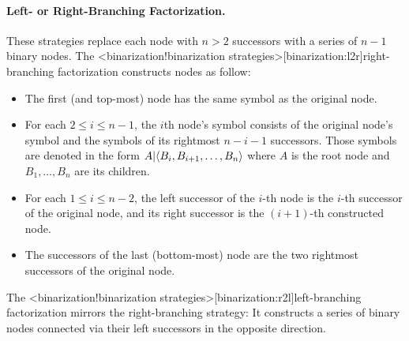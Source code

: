 \documentclass[../../document.tex]{subfiles}
\begin{document}
    \paragraph{Left- or Right-Branching Factorization.}
    These strategies replace each node with \( n>2 \) successors with a series of \( n-1 \) binary nodes.
    The <binarization!binarization strategies>[binarization:l2r]{right-branching factorization} constructs nodes as follow:
    \begin{itemize}
        \item The first (and top-most) node has the same symbol as the original node.
        \item For each \(2 \leq i \leq n-1\), the \(i\)th node's symbol consists of the original node's symbol and the symbols of its rightmost \(n-i-1\) successors. Those symbols are denoted in the form \({A}|\!\left<{B_i,B_{i+1},\ldots,B_n}\right>\) where \(A\) is the root node and \(B_1, \ldots, B_n\) are its children.
        \item For each \(1 \leq i \leq n-2\), the left successor of the \(i\)-th node is the \(i\)-th successor of the original node, and its right successor is the \((i+1)\)-th constructed node.
        \item The successors of the last (bottom-most) node are the two rightmost successors of the original node.
    \end{itemize}
    The <binarization!binarization strategies>[binarization:r2l]{left-branching factorization} mirrors the right-branching strategy: It constructs a series of binary nodes connected via their left successors in the opposite direction.
\end{document}
